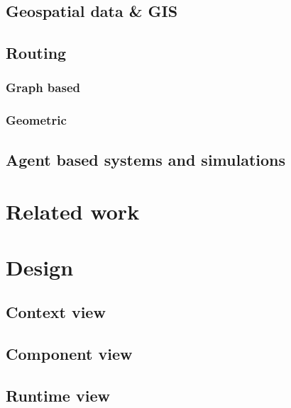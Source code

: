 \documentclass[
	11pt,
	a4paper,
	usegeometry,
	twoside,
	openright,
	toc=chapterentrywithdots
]{scrbook}
\begin{document}
		\section{Geospatial data \& GIS}
		
		\section{Routing}
		
		
			\subsection{Graph based}
		
			\subsection{Geometric}
		
		\section{Agent based systems and simulations}
		
	\chapter{Related work}
	
	\chapter{Design}
		
		\section{Context view}
		
		
		\section{Component view}
		
		
		\section{Runtime view}
		
		
\end{document}
